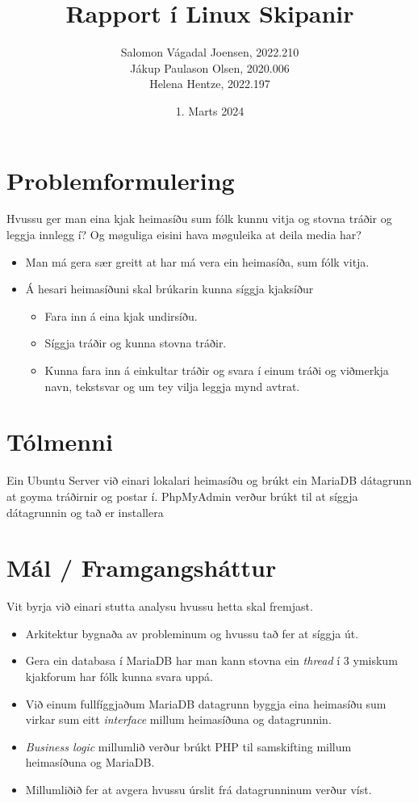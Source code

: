 \documentclass{article}
\title{Rapport í Linux Skipanir}
\author{Salomon Vágadal Joensen, 2022.210\\Jákup Paulason Olsen, 2020.006\\Helena Hentze, 2022.197}
\date{1. Marts 2024}
\begin{document}
\maketitle

\section{Problemformulering}
Hvussu ger man eina kjak heimasíðu sum fólk kunnu vitja og stovna tráðir og leggja innlegg í? Og møguliga eisini hava møguleika at deila media har? 
\begin{itemize}
    \item Man má gera sær greitt at har má vera ein heimasíða, sum fólk vitja.
    \item Á hesari heimasíðuni skal brúkarin kunna síggja kjaksíður
    \begin{itemize}
        \item Fara inn á eina kjak undirsíðu.
        \item Síggja tráðir og kunna stovna tráðir.
        \item Kunna fara inn á einkultar tráðir og svara í einum tráði og viðmerkja navn, tekstsvar og um tey vilja leggja mynd avtrat. 
    \end{itemize}
\end{itemize} 

\section{Tólmenni}
Ein Ubuntu Server við einari lokalari heimasíðu og brúkt ein MariaDB dátagrunn at goyma tráðirnir og postar í. PhpMyAdmin verður brúkt til at síggja dátagrunnin og tað er installera 

\section{Mál / Framgangsháttur}
Vit byrja við einari stutta analysu hvussu hetta skal fremjast.
\begin{itemize}
    \item Arkitektur bygnaða av probleminum og hvussu tað fer at síggja út.
    \item Gera ein databasa í MariaDB har man kann stovna ein \textit{thread} í 3 ymiskum kjakforum har fólk kunna svara uppá.
    \item Við einum fullfíggjaðum MariaDB datagrunn byggja eina heimasíðu sum virkar sum eitt \textit{interface} millum heimasíðuna og datagrunnin.
    \item \textit{Business logic} millumlið verður brúkt PHP til samskifting millum heimasíðuna og MariaDB.
    \item Millumliðið fer at avgera hvussu úrslit frá datagrunninum verður víst.
    
\end{itemize}
\end{document}
